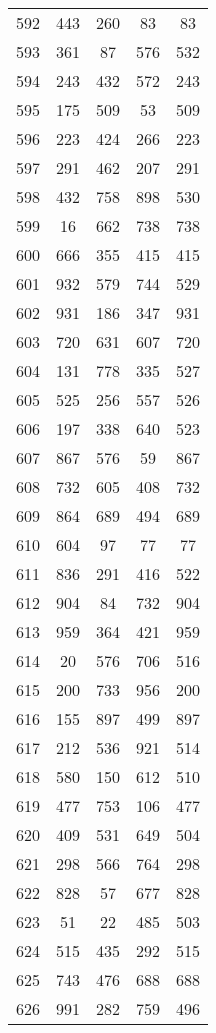 \documentclass[a4paper,10pt,ngerman]{scrartcl}
\begin{document}
\begin{longtable}[c]{c|c|c|c|c}
    592 & 443 & 260 & 83 & 83 \\
    593 & 361 & 87 & 576 & 532 \\
    594 & 243 & 432 & 572 & 243 \\
    595 & 175 & 509 & 53 & 509 \\
    596 & 223 & 424 & 266 & 223 \\
    597 & 291 & 462 & 207 & 291 \\
    598 & 432 & 758 & 898 & 530 \\
    599 & 16 & 662 & 738 & 738 \\
    600 & 666 & 355 & 415 & 415 \\
    601 & 932 & 579 & 744 & 529 \\
    602 & 931 & 186 & 347 & 931 \\
    603 & 720 & 631 & 607 & 720 \\
    604 & 131 & 778 & 335 & 527 \\
    605 & 525 & 256 & 557 & 526 \\
    606 & 197 & 338 & 640 & 523 \\
    607 & 867 & 576 & 59 & 867 \\
    608 & 732 & 605 & 408 & 732 \\
    609 & 864 & 689 & 494 & 689 \\
    610 & 604 & 97 & 77 & 77 \\
    611 & 836 & 291 & 416 & 522 \\
    612 & 904 & 84 & 732 & 904 \\
    613 & 959 & 364 & 421 & 959 \\
    614 & 20 & 576 & 706 & 516 \\
    615 & 200 & 733 & 956 & 200 \\
    616 & 155 & 897 & 499 & 897 \\
    617 & 212 & 536 & 921 & 514 \\
    618 & 580 & 150 & 612 & 510 \\
    619 & 477 & 753 & 106 & 477 \\
    620 & 409 & 531 & 649 & 504 \\
    621 & 298 & 566 & 764 & 298 \\
    622 & 828 & 57 & 677 & 828 \\
    623 & 51 & 22 & 485 & 503 \\
    624 & 515 & 435 & 292 & 515 \\
    625 & 743 & 476 & 688 & 688 \\
    626 & 991 & 282 & 759 & 496 \\

\end{longtable}
\end{document}
